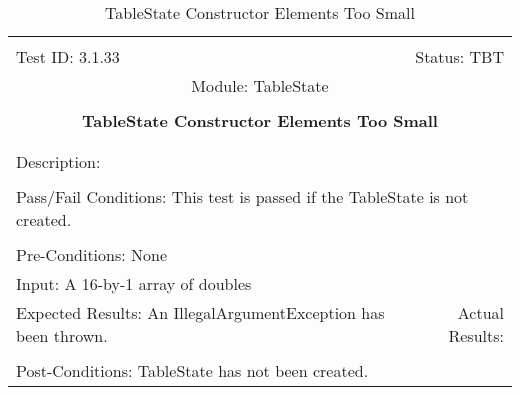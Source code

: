 \documentclass[titlepage]{article}
\begin{document}
\begin{center}%
\begin{table}
\begin{tabular}{|l r|}\hline&\\[-2mm]
	Test ID: 3.1.33	&Status: TBT\\[-3mm]
	\multicolumn{2}{|c|}{Module: TableState}\\&\\
	\multicolumn{2}{|c|}{\textbf{\large{TableState Constructor Elements Too Small}}}\\&\\\hline&\\[-3mm]
	\multicolumn{2}{|p{\textwidth}|}{Description: }\\[1mm]\hline&\\[-3mm]
	\multicolumn{2}{|p{\textwidth}|}{Pass/Fail Conditions: This test is passed if the TableState is not created.}\\[1mm]\hline&\\[-3mm]
	\multicolumn{2}{|p{\textwidth}|}{Pre-Conditions: None}\\[4mm]
	\multicolumn{2}{|p{\textwidth}|}{Input: A 16-by-1 array of doubles}\\[2mm]\hline
	\multicolumn{1}{|p{0.49\textwidth}}{Expected Results: An IllegalArgumentException has been thrown.}	&\multicolumn{1}{|p{0.45\textwidth}|}{Actual Results: }\\\hline&\\[-3mm]
	\multicolumn{2}{|p{\textwidth}|}{Post-Conditions: TableState has not been created.}\\\hline
\end{tabular}
\caption{TableState Constructor Elements Too Small}
\end{table}
\end{center}
\end{document}
